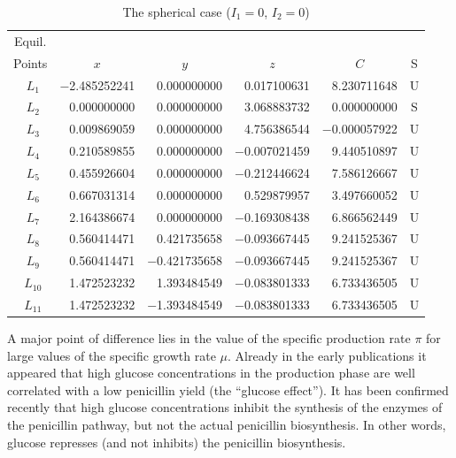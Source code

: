 \documentclass[ba]{imsart}
\numberwithin{equation}{section}
\theoremstyle{plain}
\begin{document}
\begin{table}
\begin{tabular}{crrrrc}
\hline
Equil. \\
Points & \multicolumn{1}{c}{$x$} & \multicolumn{1}{c}{$y$} & \multicolumn{1}{c}{$z$} & \multicolumn{1}{c}{$C$} &
S \\
\hline
$~~L_1$ & $-$2.485252241 & 0.000000000 & 0.017100631 & 8.230711648 & U \\
$~~L_2$ &    0.000000000 & 0.000000000 & 3.068883732 & 0.000000000 & S \\
$~~L_3$ &    0.009869059 & 0.000000000 & 4.756386544 & $-$0.000057922 & U \\
$~~L_4$ &    0.210589855 & 0.000000000 & $-$0.007021459 & 9.440510897 & U \\
$~~L_5$ &    0.455926604 & 0.000000000 & $-$0.212446624 & 7.586126667 & U \\
$~~L_6$ &    0.667031314 & 0.000000000 & 0.529879957 & 3.497660052 & U \\
$~~L_7$ &    2.164386674 & 0.000000000 & $-$0.169308438 & 6.866562449 & U \\
$~~L_8$ &    0.560414471 & 0.421735658 & $-$0.093667445 & 9.241525367 & U \\
$~~L_9$ &    0.560414471 & $-$0.421735658 & $-$0.093667445 & 9.241525367 & U
\\
$~~L_{10}$ & 1.472523232 & 1.393484549 & $-$0.083801333 & 6.733436505 & U \\
$~~L_{11}$ & 1.472523232 & $-$1.393484549 & $-$0.083801333 & 6.733436505 & U
\\ \hline
\end{tabular}
\caption{The spherical case ($I_1=0$, $I_2=0$)}
\label{sphericcase}
\end{table}


A major point of difference lies in the value of the specific
production rate $\pi$ for large values of the specific growth rate
$\mu$.  Already in the early publications \cite{akaike,dyke,greene} it
appeared that high glucose concentrations in the production phase are
well correlated with a low penicillin yield (the ``glucose
effect''). It has been confirmed recently
\cite{akaike,dyke,greene,hilbe} that high glucose concentrations
inhibit the synthesis of the enzymes of the penicillin pathway, but
not the actual penicillin biosynthesis.  In other words, glucose
represses (and not inhibits) the penicillin biosynthesis.
\end{document}
